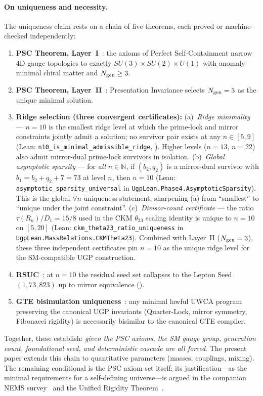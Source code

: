 \documentclass[11pt]{article}
\theoremstyle{remark}
\begin{document}
\paragraph{On uniqueness and necessity.}
The uniqueness claim rests on a chain of five theorems, each proved or machine-checked independently:
\begin{enumerate}[leftmargin=1.2em,itemsep=0.1em]
\item \textbf{PSC Theorem, Layer~I}~\cite{SpivackNEMS05}: the axioms of Perfect Self-Containment narrow 4D gauge topologies to exactly $SU(3) \times SU(2) \times U(1)$ with anomaly-minimal chiral matter and $N_{\rm gen} \ge 3$.
\item \textbf{PSC Theorem, Layer~II}~\cite{SpivackNEMS05}: Presentation Invariance selects $N_{\rm gen} = 3$ as the unique minimal solution.
\item \textbf{Ridge selection (three convergent certificates):} (a)~\emph{Ridge minimality} --- $n{=}10$ is the smallest ridge level at which the prime-lock and mirror constraints jointly admit a solution; no survivor pair exists at any $n \in [5,9]$ (Lean: \texttt{n10\_is\_minimal\_admissible\_ridge}, ).  Higher levels ($n{=}13$, $n{=}22$) also admit mirror-dual prime-lock survivors in isolation. (b)~\emph{Global asymptotic sparsity} --- for \emph{all} $n \in \mathbb{N}$, if $(b_2, q_2)$ is a mirror-dual survivor with $b_1 = b_2 + q_2 + 7 = 73$ at level $n$, then $n = 10$ (Lean: \texttt{asymptotic\_sparsity\_universal} in \texttt{UgpLean.Phase4.AsymptoticSparsity}).  This is the global $\forall n$ uniqueness statement, sharpening (a) from ``smallest'' to ``unique under the joint constraint''. (c)~\emph{Divisor-count certificate} --- the ratio $\tau(R_n)/D_1 = 15/8$ used in the CKM $\theta_{23}$ scaling identity is unique to $n{=}10$ on $[5,20]$ (Lean: \texttt{ckm\_theta23\_ratio\_uniqueness} in \texttt{UgpLean.MassRelations.CKMTheta23}).  Combined with Layer~II ($N_{\rm gen} = 3$), these three independent certificates pin $n{=}10$ as the unique ridge level for the SM-compatible UGP construction.
\item \textbf{RSUC}~\cite{SpivackUnifiedRigidity,SpivackUGPFormalization}: at $n{=}10$ the residual seed set collapses to the Lepton Seed $(1,73,823)$ up to mirror equivalence ().
\item \textbf{GTE bisimulation uniqueness}~\cite{SpivackUGPFormalization}: any minimal lawful UWCA program preserving the canonical UGP invariants (Quarter-Lock, mirror symmetry, Fibonacci rigidity) is necessarily bisimilar to the canonical GTE compiler.
\end{enumerate}
Together, these establish: \emph{given the PSC axioms, the SM gauge group, generation count, foundational seed, and deterministic cascade are all forced}.
The present paper extends this chain to quantitative parameters (masses, couplings, mixing).
The remaining conditional is the PSC axiom set itself; its justification---as the minimal requirements for a self-defining universe---is argued in the companion NEMS survey~\cite{SpivackNEMS88} and the Unified Rigidity Theorem~\cite{SpivackUnifiedRigidity}.
\end{document}
